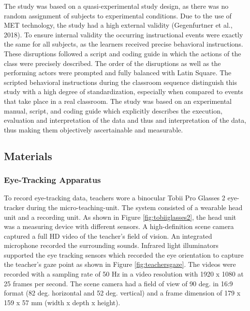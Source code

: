 \documentclass[
  man]{apa6}
\begin{document}
The study was based on a quasi-experimental study design, as there was no random assignment of subjects to experimental conditions. Due to the use of MET technology, the study had a high external validity (Gegenfurtner et al., 2018). To ensure internal validity the occurring instructional events were exactly the same for all subjects, as the learners received precise behavioral instructions. These disruptions followed a script and coding guide in which the actions of the class were precisely described. The order of the disruptions as well as the performing actors were prompted and fully balanced with Latin Square. The scripted behavioral instructions during the classroom sequence distinguish this study with a high degree of standardization, especially when compared to events that take place in a real classroom. The study was based on an experimental manual, script, and coding guide which explicitly describes the execution, evaluation and interpretation of the data and thus and interpretation of the data, thus making them objectively ascertainable and measurable.

\hypertarget{materials}{%
\subsection{Materials}\label{materials}}

\hypertarget{eye-tracking-apparatus}{%
\subsubsection{Eye-Tracking Apparatus}\label{eye-tracking-apparatus}}

To record eye-tracking data, teachers wore a binocular Tobii Pro Glasses 2 eye-tracker during the micro-teaching-unit. The system consisted of a wearable head unit and a recording unit. As shown in Figure \ref{fig:tobiiglasses2}, the head unit was a measuring device with different sensors. A high-definition scene camera captured a full HD video of the teacher's field of vision. An integrated microphone recorded the surrounding sounds. Infrared light illuminators supported the eye tracking sensors which recorded the eye orientation to capture the teacher's gaze point as shown in Figure \ref{fig:teachersgaze}. The videos were recorded with a sampling rate of 50 Hz in a video resolution with 1920 x 1080 at 25 frames per second. The scene camera had a field of view of 90 deg. in 16:9 format (82 deg. horizontal and 52 deg. vertical) and a frame dimension of 179 x 159 x 57 mm (width x depth x height).
\end{document}
